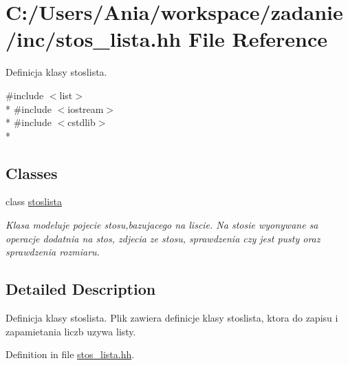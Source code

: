\hypertarget{stos__lista_8hh}{\section{C\-:/\-Users/\-Ania/workspace/zadanie/inc/stos\-\_\-lista.hh File Reference}
\label{stos__lista_8hh}
}


Definicja klasy stoslista.  


{\ttfamily \#include $<$list$>$}\\*
{\ttfamily \#include $<$iostream$>$}\\*
{\ttfamily \#include $<$cstdlib$>$}\\*
\subsection*{Classes}
\begin{DoxyCompactItemize}
\item 
class \hyperlink{classstoslista}{stoslista}
\begin{DoxyCompactList}\small\item\em Klasa modeluje pojecie stosu,bazujacego na liscie. Na stosie wyonywane sa operacje dodatnia na stos, zdjecia ze stosu, sprawdzenia czy jest pusty oraz sprawdzenia rozmiaru. \end{DoxyCompactList}\end{DoxyCompactItemize}


\subsection{Detailed Description}
Definicja klasy stoslista. Plik zawiera definicje klasy stoslista, ktora do zapisu i zapamietania liczb uzywa listy. 

Definition in file \hyperlink{stos__lista_8hh_source}{stos\-\_\-lista.\-hh}.

